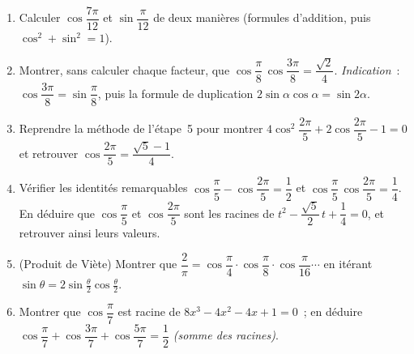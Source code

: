 \vspace{6pt}
\exolabel

\begin{mdframed}[style=exobar]
  \begin{enumerate}
    \item Calculer $\cos\dfrac{7\pi}{12}$ et $\sin\dfrac{\pi}{12}$ de deux
          manières (formules d'addition, puis $\cos^2+\sin^2=1$).

    \item Montrer, sans calculer chaque facteur, que
          $\cos\dfrac{\pi}{8}\,\cos\dfrac{3\pi}{8}=\dfrac{\sqrt2}{4}$.
          \textit{Indication}~: $\cos\dfrac{3\pi}{8}=\sin\dfrac{\pi}{8}$, puis
          la formule de duplication $2\sin\alpha\cos\alpha=\sin 2\alpha$.

    \item Reprendre la méthode de l'étape~5 pour montrer
          $4\cos^2\dfrac{2\pi}{5}+2\cos\dfrac{2\pi}{5}-1=0$ et retrouver
          $\cos\dfrac{2\pi}{5}=\dfrac{\sqrt5-1}{4}$.

    \item Vérifier les identités remarquables
          $\cos\dfrac{\pi}{5}-\cos\dfrac{2\pi}{5}=\dfrac12$ et
          $\cos\dfrac{\pi}{5}\,\cos\dfrac{2\pi}{5}=\dfrac14$. En déduire que
          $\cos\dfrac{\pi}{5}$ et $\cos\dfrac{2\pi}{5}$ sont les racines de
          $t^2-\dfrac{\sqrt5}{2}\,t+\dfrac14=0$, et retrouver ainsi leurs valeurs.

    \item (Produit de Viète) Montrer que
          $\dfrac{2}{\pi}=\cos\dfrac{\pi}{4}\cdot\cos\dfrac{\pi}{8}\cdot
          \cos\dfrac{\pi}{16}\cdots$ en itérant $\sin\theta=2\sin\tfrac\theta2\cos\tfrac\theta2$.

    \item Montrer que $\cos\dfrac{\pi}{7}$ est racine de $8x^3-4x^2-4x+1=0$~;
          en déduire $\cos\dfrac{\pi}{7}+\cos\dfrac{3\pi}{7}+\cos\dfrac{5\pi}{7}=\dfrac12$
          \textit{(somme des racines)}.
  \end{enumerate}
\end{mdframed}

